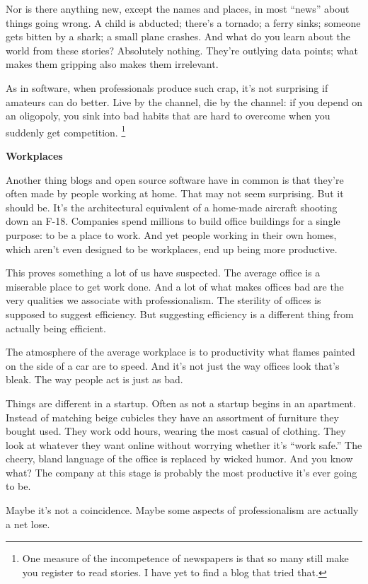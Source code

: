 Nor is there anything new, except the names and places, in most ``news''
about things going wrong. A child is abducted; there's a tornado; a
ferry sinks; someone gets bitten by a shark; a small plane crashes. And
what do you learn about the world from these stories? Absolutely
nothing. They're outlying data points; what makes them gripping also
makes them irrelevant.

As in software, when professionals produce such crap, it's not
surprising if amateurs can do better. Live by the channel, die by the
channel: if you depend on an oligopoly, you sink into bad habits that
are hard to overcome when you suddenly get competition.
\footnote{One measure of the incompetence of newspapers is that so many
still make you register to read stories. I have yet to find a blog that
tried that.}

\textbf{Workplaces}

Another thing blogs and open source software have in common is that
they're often made by people working at home. That may not seem
surprising. But it should be. It's the architectural equivalent of a
home-made aircraft shooting down an F-18. Companies spend millions to
build office buildings for a single purpose: to be a place to work. And
yet people working in their own homes, which aren't even designed to be
workplaces, end up being more productive.

This proves something a lot of us have suspected. The average office is
a miserable place to get work done. And a lot of what makes offices bad
are the very qualities we associate with professionalism. The sterility
of offices is supposed to suggest efficiency. But suggesting efficiency
is a different thing from actually being efficient.

The atmosphere of the average workplace is to productivity what flames
painted on the side of a car are to speed. And it's not just the way
offices look that's bleak. The way people act is just as bad.

Things are different in a startup. Often as not a startup begins in an
apartment. Instead of matching beige cubicles they have an assortment of
furniture they bought used. They work odd hours, wearing the most casual
of clothing. They look at whatever they want online without worrying
whether it's ``work safe.'' The cheery, bland language of the office is
replaced by wicked humor. And you know what? The company at this stage
is probably the most productive it's ever going to be.

Maybe it's not a coincidence. Maybe some aspects of professionalism are
actually a net lose.

